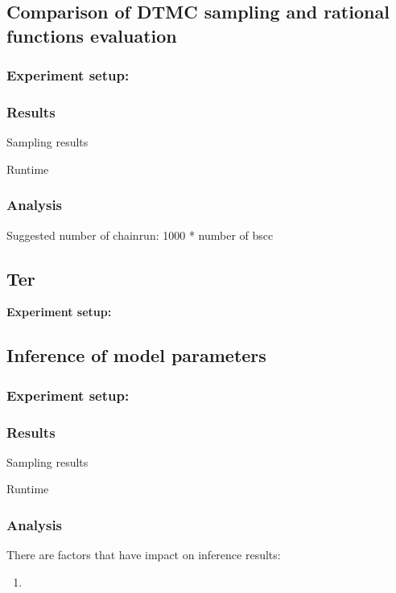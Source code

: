 \documentclass[12pt]{article}
\theoremstyle{definition}
\begin{document}
\subsection{Comparison of DTMC sampling and rational functions evaluation}
\subsubsection{Experiment setup:}

\subsubsection{Results}
Sampling results

Runtime


\subsubsection{Analysis}

Suggested number of chainrun: 1000 * number of bscc



\subsection{Ter}
\textbf{Experiment setup:}



\subsection{Inference of model parameters}
\subsubsection{Experiment setup:}

\subsubsection{Results}
Sampling results

Runtime


\subsubsection{Analysis}
There are factors that have impact on inference results:
\begin{enumerate}
\item 
\end{enumerate}
\end{document}
